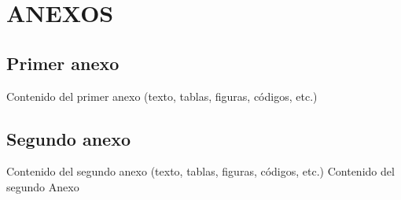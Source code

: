 \documentclass[a4paper, 11pt, spanish, twoside]{article}
\begin{document}
\appto{\bibsetup}{\sloppy}
\printbibliography[heading=bibintoc, title=BIBLIOGRAFÍA] %




\newpage

\section*{ANEXOS} \label{sec:anexos} %

\renewcommand{\thesubsection}{\Alph{subsection}} %
\renewcommand{\thetable}{\Alph{subsection}.\arabic{table}}
\renewcommand{\thefigure}{\Alph{subsection}.\arabic{figure}}
\renewcommand{\thecode}{\Alph{subsection}.\arabic{code}}

\subsection{Primer anexo} \label{sec:anexo1}

Contenido del primer anexo (texto, tablas, figuras, códigos, etc.)

\newpage
\subsection{Segundo anexo} \label{sec:anexo2}

Contenido del segundo anexo (texto, tablas, figuras, códigos, etc.)
Contenido del segundo Anexo



\end{document}
